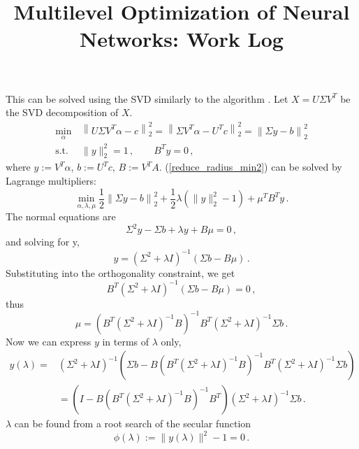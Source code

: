 \documentclass[11pt]{article}
\begin{document}
This can be solved using the SVD similarly to the algorithm \cite[pp.582--583]{GoluVanl96}. Let $X = U \Sigma V^T$ be the SVD decomposition of $X$. 
\begin{equation}
    \begin{aligned}
       \min_{\alpha}\, & \left\| U \Sigma V^T \alpha - c \right\|_2^2 
       = \left\| \Sigma V^T \alpha - U^T c \right\|_2^2 
       = \left\| \Sigma y - b \right\|_2^2 \\
        \text{s.t.}\, & \|y\|^2_2 = 1\,, \qquad B^T y = 0\,,
    \end{aligned}
    \label{reduce_radius_min2}
\end{equation}
where $y := V^T \alpha$, $b := U^T c$, $B := V^T A$. (\ref{reduce_radius_min2}) can be solved by Lagrange multipliers:
$$ \min_{\alpha,\lambda, \mu} \frac12 \left\| \Sigma y - b \right\|_2^2 + \frac12 \lambda \left( \|y\|^2_2 - 1 \right) +
\mu^T B^T y\,.$$
The normal equations are
$$ \Sigma^2 y - \Sigma b + \lambda y + B \mu = 0\,,$$
and solving for y,
$$ y = \left( \Sigma^2 + \lambda I \right)^{-1} \left( \Sigma b 
 - B \mu\right)\,.$$
Substituting into the orthogonality constraint, we get
$$ B^T \left( \Sigma^2 + \lambda I \right)^{-1} \left( \Sigma b 
 - B \mu\right) = 0\,,$$
thus
$$ \mu = \left( B^T \left( \Sigma^2 + \lambda I \right)^{-1} B \right)^{-1} B^T \left( \Sigma^2 + \lambda I \right)^{-1} \Sigma b\,. $$
Now we can express $y$ in terms of $\lambda$ only,
\begin{equation}
\begin{aligned}
y(\lambda) = & \left( \Sigma^2 + \lambda I \right)^{-1} \left( \Sigma b 
 - B \left( B^T \left( \Sigma^2 + \lambda I \right)^{-1} B \right)^{-1} B^T \left( \Sigma^2 + \lambda I \right)^{-1} \Sigma b \right) \\
      & = \left( I - B \left( B^T \left( \Sigma^2 + \lambda I \right)^{-1} B \right)^{-1} B^T\right) \left( \Sigma^2 + \lambda I \right)^{-1} \Sigma b\,.
\end{aligned}
\end{equation}
$\lambda$ can be found from a root search of the secular function
\begin{equation}
    \phi(\lambda) := \|y(\lambda)\|^2 - 1 = 0\,.
\end{equation}




\title{Multilevel Optimization of Neural Networks:
Work Log}
\end{document}
